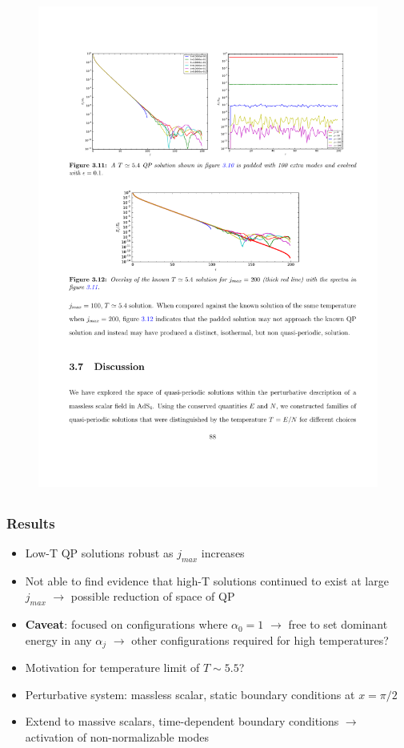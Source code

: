\documentclass[mathserif,10pt]{beamer}
\newcommand{\bi}{\begin{itemize}}
\newcommand{\ei}{\end{itemize}}
\newcommand{\its}{\item}
\newcommand{\jm}{j_{max}}
\begin{document}
{{\begin{overlayarea}{\textwidth}{0.65\textheight}
\begin{figure}
{      \includegraphics[scale=1.0]{TTFEvo}
      }
      \end{figure}
  \end{overlayarea}
}


\subsection*{}
\frame
{
  \frametitle{Results}
    \bi
    \its Low-T QP solutions robust as $\jm$ increases
    \its Not able to find evidence that high-T solutions continued to exist at large $\jm$ $\to$ possible reduction of space of QP
    \its {\bf Caveat}: focused on configurations where $\alpha_0 = 1$ $\to$ free to set dominant energy in any $\alpha_j$ $\to$ other configurations required for high temperatures?
    \its Motivation for temperature limit of $T \sim 5.5$?
    \its Perturbative system: massless scalar, static boundary conditions at $x = \pi/2$
    \its Extend to massive scalars, time-dependent boundary conditions $\to$ activation of non-normalizable modes
    \ei
}

}
\end{document}
